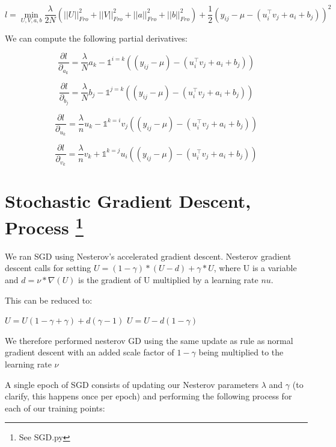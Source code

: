 \documentclass{article}
\begin{document}
$$ l =  \min_{U, V, a, b} \frac{\lambda}{2N} (||U||^{2}_{Fro} + ||V||^{2}_{Fro}
+ ||a||^{2}_{Fro} + ||b||^{2}_{Fro}) + \frac{1}{2} (y_{ij} - \mu - (u_{i}^{\intercal}v_{j} + a_{i} + b_{j}))^{2} $$

We can compute the following partial derivatives:

$$ \frac{\partial l}{\partial_{a_{k}}} = \frac{\lambda}{N} a_{k} - \mathds{1}^{i = k}((y_{ij} - \mu) -
(u_{i}^{\intercal}v_{j} + a_{i} + b_{j})) $$

$$ \frac{\partial l}{\partial_{b_{j}}} = \frac{\lambda}{N} b_{j} - \mathds{1}^{j=k}((y_{ij} - \mu) -
(u_{i}^{\intercal}v_{j} + a_{i} + b_{j})) $$


$$ \frac{\partial l}{\partial_{u_{k}}} = \frac{\lambda}{n} u_{k} - \mathds{1}^{k = i} v_{j}((y_{ij} - \mu) -
(u_{i}^{\intercal}v_{j} + a_{i} + b_{j}))  $$

$$ \frac{\partial l}{\partial_{v_{k}}} = \frac{\lambda}{n} v_{k} + \mathds{1}^{k = j} u_{i}((y_{ij} - \mu) -
(u_{i}^{\intercal}v_{j} + a_{i} + b_{j})) $$

\section*{Stochastic Gradient Descent, Process \footnote{See SGD.py}}

We ran SGD using Nesterov's accelerated gradient descent.
Nesterov gradient descent calls for setting
$U = (1 - \gamma) * (U - d) + \gamma * U$, where U is
a variable and $d = \nu * \nabla(U)$ is the gradient of U
multiplied by a learning rate $nu$.

This can be reduced to:
\begin{center}
$ U = U(1 - \gamma + \gamma) + d(\gamma - 1) $
$ U = U - d(1 - \gamma) $
\end{center}

We therefore performed nesterov GD using
the same update as rule as normal gradient descent with an
added scale factor of $1 - \gamma$ being multiplied to the
learning rate $\nu$

A single epoch of SGD consists of updating our Nesterov
parameters $\lambda$ and $\gamma$ (to clarify, this happens once per epoch)
and performing the following process for each of our training points:
\end{document}
